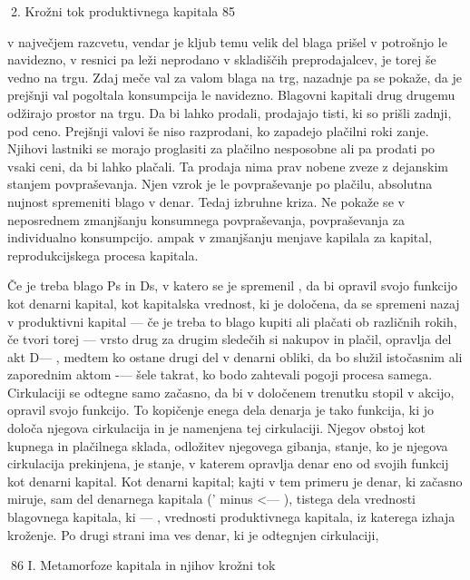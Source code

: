 \documentclass[kapital_02.tex]{subfiles}
\begin{document}
2. Krožni tok produktivnega kapitala 85



 v največjem razcvetu, vendar je kljub temu velik del blaga prišel v potrošnjo le navidezno, v resnici pa leži neprodano v skladiščih preprodajalcev, je torej še vedno na trgu. Zdaj meče val za valom blaga na trg, nazadnje pa se pokaže, da je prejšnji val pogoltala konsumpcija le navidezno. Blagovni kapitali drug drugemu odžirajo prostor na trgu. Da bi lahko prodali, prodajajo tisti, ki so prišli zadnji, pod ceno. Prejšnji valovi še niso razprodani, ko zapadejo plačilni roki zanje. Njihovi lastniki se morajo proglasiti za plačilno nesposobne ali pa prodati po vsaki ceni, da bi lahko plačali. Ta prodaja nima prav nobene zveze z dejanskim stanjem povpraševanja. Njen vzrok je le povpraševanje po plačilu, absolutna nujnost spremeniti blago v denar. Tedaj izbruhne kriza. Ne pokaže se v neposrednem zmanjšanju konsumnega povpraševanja, povpraševanja za individualno konsumpcijo. ampak v zmanjšanju menjave kapilala za kapital, reprodukcijskega procesa kapitala.

Če je treba blago Ps in Ds, v katero se je spremenil \KPED, da bi opravil svojo funkcijo kot denarni kapital, kot kapitalska vrednost, ki je določena, da se spremeni nazaj v produktivni kapital — če je treba to blago kupiti ali plačati ob različnih rokih, če tvori torej \KPED — \KPEB vrsto drug za drugim sledečih si nakupov in plačil, opravlja del \KPED akt D— \KPEB, medtem ko ostane drugi del v denarni obliki, da bo služil istočasnim ali zaporednim aktom \KPED-— \KPEB šele takrat, ko bodo zahtevali pogoji procesa samega. Cirkulaciji se odtegne samo začasno, da bi v določenem trenutku stopil v akcijo, opravil svojo funkcijo. To kopičenje enega dela denarja je tako funkcija, ki jo določa njegova cirkulacija in je namenjena tej cirkulaciji. Njegov obstoj kot kupnega in plačilnega sklada, odložitev njegovega gibanja, stanje, ko je njegova cirkulacija prekinjena, je stanje, v katerem opravlja denar eno od svojih funkcij kot denarni kapital. Kot denarni kapital; kajti v tem primeru je denar, ki začasno miruje, sam del denarnega kapitala \KPED (\KPED' minus \KPEd <— \KPED), tistega dela vrednosti blagovnega kapitala, ki — \KPEP, vrednosti produktivnega kapitala, iz katerega izhaja kroženje. Po drugi strani ima ves denar, ki je odtegnjen cirkulaciji,



86 I. Metamorfoze kapitala in njihov krožni tok
\end{document}
